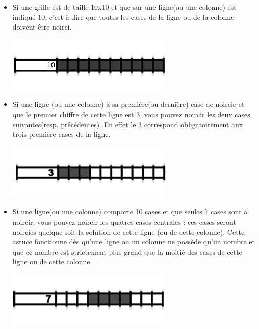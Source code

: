 	\begin{itemize}
		\item Si une grille est de taille 10x10 et que sur une ligne(ou une colonne) est indiqué 10, c'est à dire que toutes les cases de la ligne ou de la colonne doivent être noirci.\\

	\begin{center}
		\includegraphics{data/manuels/10par10.png}\\
	\end{center}

		\item Si une ligne (ou une colonne) à sa première(ou dernière) case de noircie et que le premier chiffre de cette ligne est 3, vous pouvez noircir les deux cases suivantes(resp. précédentes). En effet le 3 correspond obligatoirement aux trois première cases de la ligne.\\
	\begin{center}
		\includegraphics{data/manuels/3premier.png}\\
	\end{center}
\newpage
		\item Si une ligne(ou une colonne) comporte 10 cases et que seules 7 cases sont à noircir, vous pouvez noircir les quatres cases centrales : ces cases seront noircies quelque soit la solution de cette ligne (ou de cette colonne). Cette astuce fonctionne dès qu'une ligne ou un colonne ne possède qu'un nombre et que ce nombre est strictement plus grand que la moitié des cases de cette ligne ou de cette colonne.\\

	\begin{center}
		\includegraphics{data/manuels/7casesSur10.png}
	\end{center}
		

\end{itemize}
